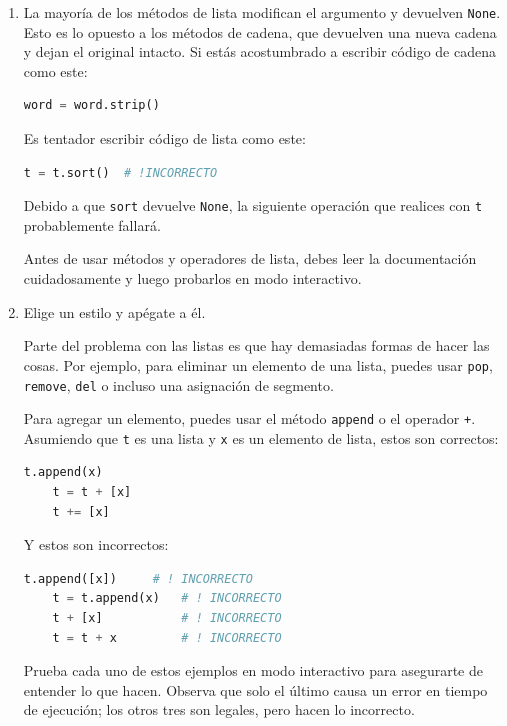 \begin{enumerate}
    \item La mayoría de los métodos de lista modifican el argumento y devuelven \texttt{None}. Esto es lo opuesto a los métodos de cadena, que devuelven una nueva cadena y dejan el original intacto. Si estás acostumbrado a escribir código de cadena como este:
    
    \begin{lstlisting}[language=Python]
    word = word.strip()
    \end{lstlisting}
    
    Es tentador escribir código de lista como este:
    
    \begin{lstlisting}[language=Python]
    t = t.sort()  # !INCORRECTO
    \end{lstlisting}

    
    Debido a que \texttt{sort} devuelve \texttt{None}, la siguiente operación que realices con \texttt{t} probablemente fallará.
    
    Antes de usar métodos y operadores de lista, debes leer la documentación cuidadosamente y luego probarlos en modo interactivo.
    
    \item Elige un estilo y apégate a él.
    
    Parte del problema con las listas es que hay demasiadas formas de hacer las cosas. Por ejemplo, para eliminar un elemento de una lista, puedes usar \texttt{pop}, \texttt{remove}, \texttt{del} o incluso una asignación de segmento.
    
    Para agregar un elemento, puedes usar el método \texttt{append} o el operador \texttt{+}. Asumiendo que \texttt{t} es una lista y \texttt{x} es un elemento de lista, estos son correctos:
    
    \begin{lstlisting}[language=Python]
    t.append(x)
    t = t + [x]
    t += [x]
    \end{lstlisting}
    
    Y estos son incorrectos:
    
    \begin{lstlisting}[language=Python]
    t.append([x])     # ! INCORRECTO
    t = t.append(x)   # ! INCORRECTO
    t + [x]           # ! INCORRECTO
    t = t + x         # ! INCORRECTO
    \end{lstlisting}


    
    Prueba cada uno de estos ejemplos en modo interactivo para asegurarte de entender lo que hacen. Observa que solo el último causa un error en tiempo de ejecución; los otros tres son legales, pero hacen lo incorrecto.
    

\end{enumerate}
